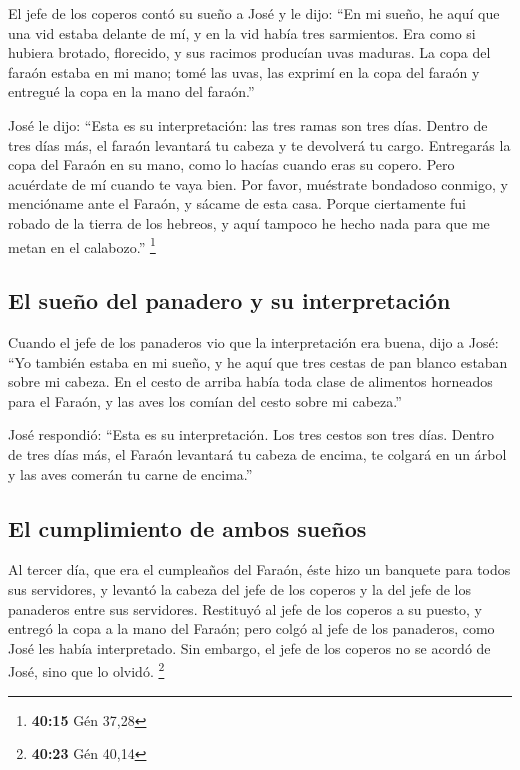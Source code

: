 \begin{paracol}{2}
 El jefe de los coperos contó su sueño a José y le dijo:
``En mi sueño, he aquí que una vid estaba delante de mí, 
y en la vid había tres sarmientos. Era como si hubiera brotado,
florecido, y sus racimos producían uvas maduras.  La copa
del faraón estaba en mi mano; tomé las uvas, las exprimí en la copa del
faraón y entregué la copa en la mano del faraón.''

 José le dijo: ``Esta es su interpretación: las tres
ramas son tres días.  Dentro de tres días más, el faraón
levantará tu cabeza y te devolverá tu cargo. Entregarás la copa del
Faraón en su mano, como lo hacías cuando eras su copero. 
Pero acuérdate de mí cuando te vaya bien. Por favor, muéstrate bondadoso
conmigo, y mencióname ante el Faraón, y sácame de esta casa.
 Porque ciertamente fui robado de la tierra de los
hebreos, y aquí tampoco he hecho nada para que me metan en el
calabozo.'' \footnote{\textbf{40:15} Gén 37,28}

\hypertarget{el-sueuxf1o-del-panadero-y-su-interpretaciuxf3n}{%
\subsection{El sueño del panadero y su
interpretación}\label{el-sueuxf1o-del-panadero-y-su-interpretaciuxf3n}}

 Cuando el jefe de los panaderos vio que la
interpretación era buena, dijo a José: ``Yo también estaba en mi sueño,
y he aquí que tres cestas de pan blanco estaban sobre mi cabeza.
 En el cesto de arriba había toda clase de alimentos
horneados para el Faraón, y las aves los comían del cesto sobre mi
cabeza.''

 José respondió: ``Esta es su interpretación. Los tres
cestos son tres días.  Dentro de tres días más, el Faraón
levantará tu cabeza de encima, te colgará en un árbol y las aves comerán
tu carne de encima.''

\hypertarget{el-cumplimiento-de-ambos-sueuxf1os}{%
\subsection{El cumplimiento de ambos
sueños}\label{el-cumplimiento-de-ambos-sueuxf1os}}

 Al tercer día, que era el cumpleaños del Faraón, éste
hizo un banquete para todos sus servidores, y levantó la cabeza del jefe
de los coperos y la del jefe de los panaderos entre sus servidores.
 Restituyó al jefe de los coperos a su puesto, y entregó
la copa a la mano del Faraón;  pero colgó al jefe de los
panaderos, como José les había interpretado.  Sin
embargo, el jefe de los coperos no se acordó de José, sino que lo
olvidó. \footnote{\textbf{40:23} Gén 40,14}


\end{paracol}
